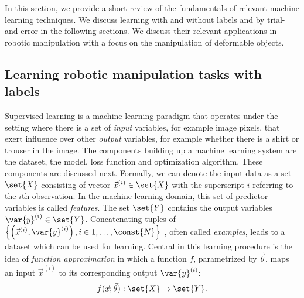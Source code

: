 \documentclass[\home/main.tex]{subfiles}
\begin{document}
In this section, we provide a short review of the fundamentals of relevant machine learning techniques. We discuss learning with and without labels and by trial-and-error in the following sections. We discuss their relevant applications in robotic manipulation with a focus on the manipulation of deformable objects. 

\subsection{Learning robotic manipulation tasks with labels} \label{subsec:lit_sl}
Supervised learning is a machine learning paradigm that operates under the setting where there is a set of \textit{input} variables, for example image pixels, that exert influence over other \textit{output} variables, for example whether there is a shirt or trouser in the image.
The components building up a machine learning system are the dataset, the model, loss function and optimization algorithm. These components are discussed next. 
Formally, we can denote the input data as a set $\set{X}$ consisting of vector $\vec{x}^{(i)} \in \set{X} $ with the superscript $i$ referring to the $i$th observation. In the machine learning domain, this set of predictor variables is called \textit{features}. The set $\set{Y}$ contains the output variables $\var{y}^{(i)} \in \set{Y}$. Concatenating tuples of
$\left\{\left(\vec{x}^{(i)}, \var{y}^{(i)}\right) , i \in 1,\dots,\const{N} \right\}$
, often called \textit{examples}, leads to a dataset which can be used for learning. Central in this learning procedure is the idea of \textit{function approximation} in which a function $f$, parametrized by $\vec{\theta}$, maps an input $\vec{x}^{(i)}$ to its corresponding output $\var{y}^{(i)}$:
\begin{equation*}
	f(\vec{x};\vec{\theta}): \set{X} \mapsto \set{Y}\text{.}
\end{equation*}
\end{document}

